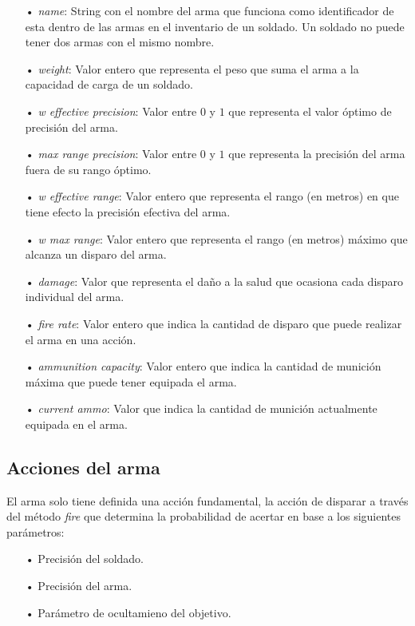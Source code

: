 \documentclass[twoside]{article}
\begin{document}
		\begin{itemize}
			\item[•] \emph{name}: String con el nombre del arma que funciona como identificador de esta dentro de las armas en el inventario de un soldado. Un soldado no puede tener dos armas con el mismo nombre.
			\item[•] \emph{weight}: Valor entero que representa el peso que suma el arma a la capacidad de carga de un soldado.
			\item[•] \emph{w effective precision}: Valor entre $0$ y $1$ que representa el valor \'optimo de precisi\'on del arma.
			\item[•] \emph{max range precision}: Valor entre $0$ y $1$ que representa la precisi\'on del arma fuera de su rango \'optimo.
			\item[•] \emph{w effective range}: Valor entero que representa el rango (en metros) en que tiene efecto la precisi\'on efectiva del arma.
			\item[•] \emph{w max range}: Valor entero que representa el rango (en metros) m\'aximo que alcanza un disparo del arma.
			\item[•] \emph{damage}: Valor que representa el da\~no a la salud que ocasiona cada disparo individual del arma.
			\item[•] \emph{fire rate}: Valor entero que indica la cantidad de disparo que puede realizar el arma en una acci\'on.
			\item[•] \emph{ammunition capacity}: Valor entero que indica la cantidad de munici\'on m\'axima que puede tener equipada el arma.
			\item[•] \emph{current ammo}: Valor que indica la cantidad de munici\'on actualmente equipada en el arma.
			
		\end{itemize}
		
		
		\subsection{Acciones del arma}
		
		El arma solo tiene definida una acci\'on fundamental, la acci\'on de disparar a trav\'es del m\'etodo \emph{fire} que determina la probabilidad de acertar en base a los siguientes par\'ametros:
		
		\begin{itemize}
			\item[•] Precisi\'on del soldado.
			\item[•] Precisi\'on del arma.
			\item[•] Par\'ametro de ocultamieno del objetivo.
		\end{itemize}
		
\end{document}
